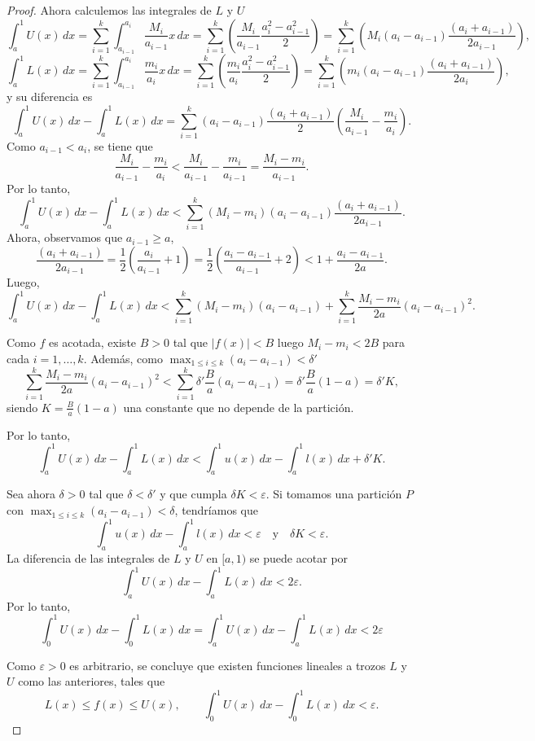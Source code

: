 \begin{proof}
    Ahora calculemos las integrales de $L$ y $U$
    \[
        \int_{a}^1 U(x) \, dx = 
        \sum_{i=1}^k \int_{a_{i-1}}^{a_i} \frac{M_i}{a_{i-1}} x \, dx =
        \sum_{i=1}^k \left(\frac{M_i}{a_{i-1}}\frac{a_i^2-a_{i-1}^2}{2}\right) =
        \sum_{i=1}^k \left(M_i(a_i-a_{i-1})\frac{(a_i+a_{i-1})}{2a_{i-1}}\right),
    \]
    \[
        \int_{a}^1 L(x) \, dx = 
        \sum_{i=1}^k \int_{a_{i-1}}^{a_i} \frac{m_i}{a_i} x \, dx =
        \sum_{i=1}^k \left(\frac{m_i}{a_i}\frac{a_i^2-a_{i-1}^2}{2}\right) =
        \sum_{i=1}^k \left(m_i(a_i-a_{i-1})\frac{(a_i+a_{i-1})}{2a_i}\right),
    \]
    y su diferencia es
    \[
        \int_{a}^1 U(x) \, dx - \int_{a}^1 L(x) \, dx = 
        \sum_{i=1}^k (a_i-a_{i-1})\frac{(a_i+a_{i-1})}{2}\left(\frac{M_i}{a_{i-1}} - \frac{m_i}{a_i}\right).
    \]
    Como $a_{i-1} < a_i$, se tiene que 
    \[
        \frac{M_i}{a_{i-1}} - \frac{m_i}{a_i} < 
        \frac{M_i}{a_{i-1}} - \frac{m_i}{a_{i-1}} = 
        \frac{M_i - m_i}{a_{i-1}}.
    \]
    Por lo tanto,
    \[
        \int_{a}^1 U(x) \, dx - \int_{a}^1 L(x) \, dx < 
        \sum_{i=1}^k (M_i - m_i)(a_i-a_{i-1})\frac{(a_i+a_{i-1})}{2a_{i-1}}.
    \]
    Ahora, observamos que $a_{i-1} \geq a$, 
    \[
        \frac{(a_i+a_{i-1})}{2a_{i-1}} = 
        \frac{1}{2}\left(\frac{a_i}{a_{i-1}} + 1\right) =
        \frac{1}{2}\left(\frac{a_i - a_{i-1}}{a_{i-1}} + 2\right) <
        1+ \frac{a_i - a_{i-1}}{2a}.
    \]
    Luego,
    \[
        \int_{a}^1 U(x) \, dx - \int_{a}^1 L(x) \, dx < 
        \sum_{i=1}^k (M_i - m_i)(a_i-a_{i-1}) + \sum_{i=1}^k \frac{M_i-m_i}{2a}(a_i-a_{i-1})^2.
    \]
    
    Como $f$ es acotada, existe $B > 0$ tal que $|f(x)| < B$ luego $M_i - m_i < 2B$ para
    cada $i=1,\ldots,k$. Además, como $\max_{1 \leq i \leq k} (a_i - a_{i-1}) < \delta'$
    \[
        \sum_{i=1}^k \frac{M_i-m_i}{2a}(a_i-a_{i-1})^2 <
        \sum_{i=1}^k \delta' \frac{B}{a}(a_i-a_{i-1})= 
        \delta' \frac{B}{a} (1-a) =
        \delta' K,
    \]
    siendo $K = \frac{B}{a} (1-a)$ una constante que no depende de la partición. 
    
    Por lo tanto,
    \[
        \int_a^1 U(x) \, dx - \int_a^1 L(x) \, dx < 
        \int_a^1 u(x)\,dx - \int_a^1 l(x)\,dx + \delta' K.
    \]

    Sea ahora $\delta > 0$ tal que $\delta < \delta'$ y que cumpla $\delta K < \varepsilon$. 
    Si tomamos una partición $P$ con $\max_{1 \leq i \leq k} (a_i - a_{i-1}) < \delta$, tendríamos que
    \[
        \int_a^1 u(x) \, dx - \int_a^1 l(x) \, dx < \varepsilon
        \quad \text{y} \quad 
        \delta K < \varepsilon.
    \]
    La diferencia de las integrales de $L$ y $U$ en $[a,1)$ se puede acotar por
    \[
        \int_{a}^1 U(x) \, dx - \int_{a}^1 L(x) \, dx < 
        2\varepsilon.
    \]
     Por lo tanto,
     \[
        \int_0^1 U(x) \, dx - \int_0^1 L(x) \, dx = 
        \int_a^1 U(x) \, dx - \int_a^1 L(x) \, dx < 2\varepsilon
    \]
    
    Como $\varepsilon > 0$ es arbitrario, se concluye que existen funciones lineales a trozos $L$ y $U$ 
    como las anteriores, tales que
    \[
        L(x) \leq f(x) \leq U(x), \qquad \int_0^1 U(x)\ dx - \int_0^1 L(x)\ dx < \varepsilon.
    \]
\end{proof}
